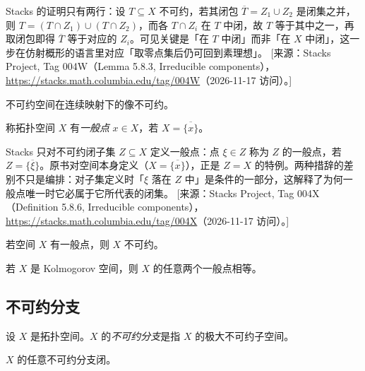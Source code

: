 \begin{yizhu}
Stacks 的证明只有两行：设 $T\subseteq X$ 不可约，若其闭包 $\overline{T}=Z_1\cup Z_2$ 是闭集之并，则 $T=(T\cap Z_1)\cup(T\cap Z_2)$，而各 $T\cap Z_i$ 在 $T$ 中闭，故 $T$ 等于其中之一，再取闭包即得 $\overline{T}$ 等于对应的 $Z_i$。可见关键是「在 $T$ 中闭」而非「在 $X$ 中闭」，这一步在仿射概形的语言里对应「取零点集后仍可回到素理想」。
[来源：Stacks Project, Tag 004W（Lemma 5.8.3, Irreducible components），\url{https://stacks.math.columbia.edu/tag/004W}（2026-11-17 访问）。]
\end{yizhu}

\begin{exercise}\label{exc:21.1.4}
不可约空间在连续映射下的像不可约。
\end{exercise}

\begin{definition}\label{def:21.1.5}
称拓扑空间 $X$ 有\emph{一般点} $x\in X$，若 $X=\overline{\{x\}}$。
\end{definition}

\begin{yizhu}
Stacks 只对不可约闭子集 $Z\subseteq X$ 定义一般点：点 $\xi\in Z$ 称为 $Z$ 的一般点，若 $Z=\overline{\{\xi\}}$。原书对空间本身定义（$X=\overline{\{x\}}$），正是 $Z=X$ 的特例。两种措辞的差别不只是编排：对子集定义时「$\xi$ 落在 $Z$ 中」是条件的一部分，这解释了为何一般点唯一时它必属于它所代表的闭集。
[来源：Stacks Project, Tag 004X（Definition 5.8.6, Irreducible components），\url{https://stacks.math.columbia.edu/tag/004X}（2026-11-17 访问）。]
\end{yizhu}

\begin{exercise}\label{exc:21.1.6}
若空间 $X$ 有一般点，则 $X$ 不可约。
\end{exercise}

\begin{exercise}\label{exc:21.1.7}
若 $X$ 是 Kolmogorov 空间，则 $X$ 的任意两个一般点相等。
\end{exercise}

\subsection{不可约分支}\label{sec:21.2}

\begin{definition}\label{def:21.2.1}
设 $X$ 是拓扑空间。$X$ 的\emph{不可约分支}是指 $X$ 的极大不可约子空间。
\end{definition}

\begin{exercise}\label{exc:21.2.2}
$X$ 的任意不可约分支闭。
\end{exercise}


